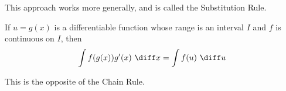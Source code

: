 \begin{frame}
This approach works more generally, and is called the Substitution Rule.
\begin{theorem}
If $u = g(x)$ is a differentiable function whose range is an interval $I$ and $f$ is continuous on $I$, then
\[
\int f(g(x)) g'(x) \ \diff x = \int f(u)\ \diff u
\]
\end{theorem}
This is the opposite of the Chain Rule.
\end{frame}
